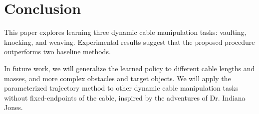 \section{Conclusion}

This paper explores learning three dynamic cable manipulation tasks:  vaulting, knocking, and weaving. Experimental results suggest that the proposed procedure outperforms two baseline methods.

In future work, we will generalize the learned policy to different cable lengths and masses, and more complex obstacles and target objects. We will apply the parameterized trajectory method to other dynamic cable manipulation tasks without fixed-endpoints of the cable, inspired by the adventures of Dr. Indiana Jones.
